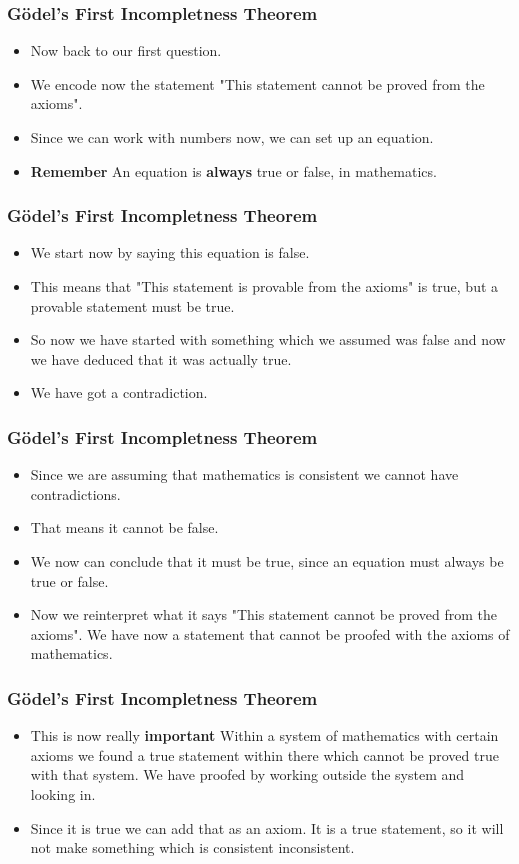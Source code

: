 \documentclass[aspectratio=169]{beamer}
\begin{document}
\begin{frame}
	\frametitle{Gödel's First Incompletness Theorem}
	\begin{itemize}
		\item Now back to our first question.
		\item We encode now the statement "This statement cannot be proved from the axioms".
		\item Since we can work with numbers now, we can set up an equation.
		\item \textbf{Remember} An equation is \textbf{always} true or false, in mathematics.
	\end{itemize}
\end{frame}

\begin{frame}
	\frametitle{Gödel's First Incompletness Theorem}
	\begin{itemize}
		\item We start now by saying this equation is false. 
		\item This means that "This statement is provable from the axioms" is true, but a provable statement must be true.
		\item So now we have started with something which we assumed was false and now we have deduced that it was actually true. 
		\item We have got a contradiction.
	\end{itemize}
\end{frame}

\begin{frame}
	\frametitle{Gödel's First Incompletness Theorem}
	\begin{itemize}
		\item Since we are assuming that mathematics is consistent we cannot have contradictions.
		\item That means it cannot be false. 
		\item We now can conclude that it must be true, since an equation must always be true or false.
		\item Now we reinterpret what it says "This statement cannot be proved from the axioms". We have now a statement that cannot be proofed with the axioms of mathematics.
	\end{itemize}
\end{frame}

\begin{frame}
	\frametitle{Gödel's First Incompletness Theorem}
	\begin{itemize}
		\item This is now really \textbf{important} Within a system of mathematics with certain axioms we found a true statement within there which cannot be proved true with that system. We have proofed by working outside the system and looking in. 
		\item Since it is true we can add that as an axiom. It is a true statement, so it will not make something which is consistent inconsistent.
	\end{itemize}
\end{frame}
\end{document}
